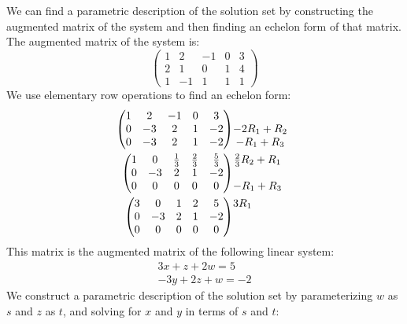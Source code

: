 \documentclass[12pt]{article}
\newenvironment{problem}[2][Problem]
{
	\begin{trivlist} 
		\item[\hskip \labelsep {\bfseries #1 #2:}]
	}
{
	\end{trivlist}
	}
\newenvironment{solution}[1][Solution]
{
	\begin{trivlist} 
		\item[\hskip \labelsep {\itshape #1:}]
	}
	{
	\end{trivlist}
}
\begin{document}
\begin{problem}{4}
\noindent
\newline
\newline
\begin{solution}
We can find a parametric description of the solution set by constructing the augmented matrix of the system and then finding an echelon form of that matrix. The augmented matrix of the system is:
\[
\begin{pmatrix}1&2&-1&0&3\\2&1&0&1&4\\1&-1&1&1&1\end{pmatrix}
\]
We use elementary row operations to find an echelon form:
\begin{align*}
\begin{pmatrix}1&2&-1&0&3\\0&-3&2&1&-2\\0&-3&2&1&-2\end{pmatrix}
&\begin{matrix}
\hphantom{1}\\
-2R_1+R_2
\hphantom{1}\\
-R_1+R_3
\hphantom{1}
\end{matrix}\\
%
%
%
\begin{pmatrix}1&0&\frac{1}{3}&\frac{2}{3}&\frac{5}{3}\\0&-3&2&1&-2\\0&0&0&0&0\end{pmatrix}
&\begin{matrix}
\frac{2}{3}R_2+R_1
\hphantom{1}\\
\hphantom{1}\\
-R_1+R_3
\hphantom{1}
\end{matrix}\\
%
%
%
\begin{pmatrix}3&0&1&2&5\\0&-3&2&1&-2\\0&0&0&0&0\end{pmatrix}
&\begin{matrix}
3R_1
\hphantom{1}\\
\hphantom{1}\\
\hphantom{1}
\end{matrix}
\end{align*}
This matrix is the augmented matrix of the following linear system:
\begin{align*}
3x+z+2w=5\\
-3y+2z+w=-2
\end{align*}
We construct a parametric description of the solution set by parameterizing $w$ as $s$ and $z$ as $t$, and solving for $x$ and $y$ in terms of $s$ and $t$:

\end{solution}
\end{problem}
\end{document}
